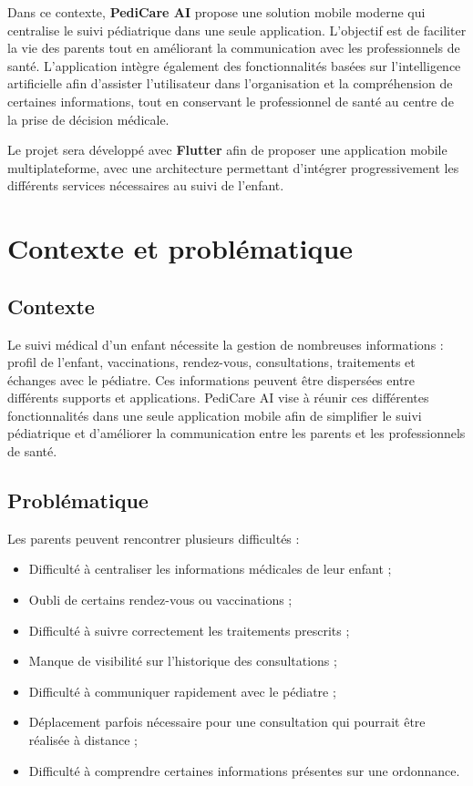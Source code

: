 \documentclass[11pt,a4paper]{article}
\begin{document}
Dans ce contexte, \textbf{PediCare AI} propose une solution mobile moderne qui centralise le suivi pédiatrique dans une seule application. L'objectif est de faciliter la vie des parents tout en améliorant la communication avec les professionnels de santé. L'application intègre également des fonctionnalités basées sur l'intelligence artificielle afin d'assister l'utilisateur dans l'organisation et la compréhension de certaines informations, tout en conservant le professionnel de santé au centre de la prise de décision médicale.

Le projet sera développé avec \textbf{Flutter} afin de proposer une application mobile multiplateforme, avec une architecture permettant d'intégrer progressivement les différents services nécessaires au suivi de l'enfant.

\section{Contexte et problématique}

\subsection{Contexte}

Le suivi médical d'un enfant nécessite la gestion de nombreuses informations : profil de l'enfant, vaccinations, rendez-vous, consultations, traitements et échanges avec le pédiatre. Ces informations peuvent être dispersées entre différents supports et applications. PediCare AI vise à réunir ces différentes fonctionnalités dans une seule application mobile afin de simplifier le suivi pédiatrique et d'améliorer la communication entre les parents et les professionnels de santé.

\subsection{Problématique}

Les parents peuvent rencontrer plusieurs difficultés :

\begin{itemize}
  \item Difficulté à centraliser les informations médicales de leur enfant ;
  \item Oubli de certains rendez-vous ou vaccinations ;
  \item Difficulté à suivre correctement les traitements prescrits ;
  \item Manque de visibilité sur l'historique des consultations ;
  \item Difficulté à communiquer rapidement avec le pédiatre ;
  \item Déplacement parfois nécessaire pour une consultation qui pourrait être réalisée à distance ;
  \item Difficulté à comprendre certaines informations présentes sur une ordonnance.
\end{itemize}
\end{document}
